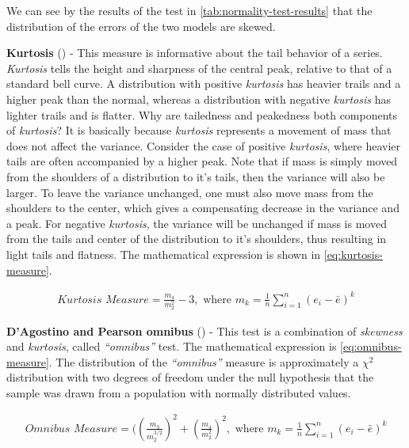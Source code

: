 We can see by the results of the test in
\autoref{tab:normality-test-results} that the distribution of the
errors of the two models are skewed.

\textbf{Kurtosis} (\cite{anscombe1983distribution}) - This measure is
informative about the tail behavior of a series. \textit{Kurtosis}
tells the height and sharpness of the central peak, relative to that
of a standard bell curve. A distribution with positive
\textit{kurtosis} has heavier trails and a higher peak than the
normal, whereas a distribution with negative \textit{kurtosis} has
lighter trails and is flatter. Why are tailedness and peakedness both
components of \textit{kurtosis}? It is basically because
\textit{kurtosis} represents a movement of mass that does not affect
the variance. Consider the case of positive \textit{kurtosis}, where
heavier tails are often accompanied by a higher peak. Note that if
mass is simply moved from the shoulders of a distribution to it's
tails, then the variance will also be larger. To leave the variance
unchanged, one must also move mass from the shoulders to the center,
which gives a compensating decrease in the variance and a peak. For
negative \textit{kurtosis}, the variance will be unchanged if mass is
moved from the tails and center of the distribution to it's shoulders,
thus resulting in light tails and flatness. The mathematical
expression is shown in \autoref{eq:kurtosis-measure}.

\begin{equation}
  \begin{aligned}
    \label{eq:kurtosis-measure}
    \textit{Kurtosis Measure} = \frac{m_4}{m_2^2} - 3, \text{ where }
    m_k = \frac{1}{n} \displaystyle\sum_{i=1}^n (e_i - \bar{e})^k
  \end{aligned}
\end{equation}

\textbf{D’Agostino and Pearson omnibus} (\cite{d1971omnibus,
d1973tests}) - This test is a combination of \textit{skewness} and
\textit{kurtosis}, called \textit{``omnibus''} test. The mathematical
expression is \autoref{eq:omnibus-measure}. The distribution of the
\textit{``omnibus''} measure is approximately a $\chi^2$ distribution
with two degrees of freedom under the null hypothesis that the sample
was drawn from a population with normally distributed values.

\begin{equation}
  \begin{aligned}
    \label{eq:omnibus-measure}
    \textit{Omnibus Measure} =
    ((\frac{m_3}{m_2^{3/2}})^2 + (\frac{m_4}{m_2^2})^2, \text{ where }
    m_k = \frac{1}{n} \displaystyle\sum_{i=1}^n (e_i - \bar{e} )^k
  \end{aligned}
\end{equation}

